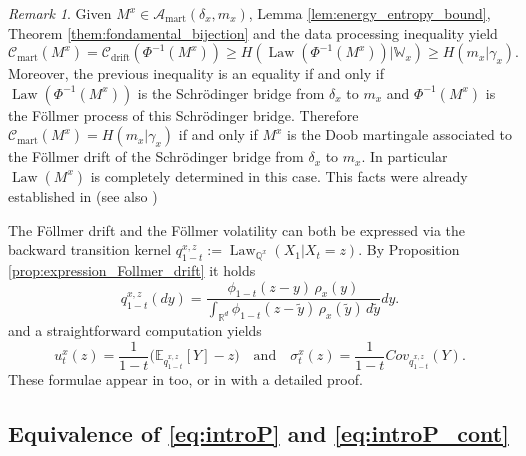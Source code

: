 \documentclass[reqno, a4paper]{amsart}
\theoremstyle{plain}
\theoremstyle{definition}
\theoremstyle{remark}
\newtheorem{remark}[theorem]{Remark}
\numberwithin{equation}{section}
\numberwithin{theorem}{section}
\newcommand{\R}{\mathbb{R}}
\newcommand{\E}{\mathbb{E}}
\newcommand{\Law}{\operatorname{Law}}
\begin{document}
	\begin{remark}\label{remq:uniquess_of_Pcont}
		Given $M^x \in \mathcal A_{\mathrm{mart}}(\delta_x,m_x)$, Lemma \ref{lem:energy_entropy_bound}, Theorem \ref{them:fondamental_bijection} and the data processing inequality yield $$\mathcal{C}_{\mathrm{mart}}(M^x) = \mathcal{C}_{\mathrm{drift}}(\Phi^{-1}(M^x)) \geq H(\Law(\Phi^{-1}(M^x))|\mathbb{W}_x) \geq H(m_x|\gamma_x).$$ Moreover, the previous inequality is an equality if and only if $\Law(\Phi^{-1}(M^x))$ is the Schrödinger bridge from $\delta_x$ to $m_x$ and $\Phi^{-1}(M^x)$ is the Föllmer process of this Schrödinger bridge. Therefore $\mathcal{C}_{\mathrm{mart}}(M^x) = H(m_x|\gamma_x)$ if and only if $M^x$ is the Doob martingale associated to the Föllmer drift of the Schrödinger bridge from $\delta_x$ to $m_x$. In particular $\Law(M^x)$ is completely determined in this case. This facts were already established in \cite{ElMi20} (see also \cite{CoFaMi24})
	\end{remark}
	The Föllmer drift and the Föllmer volatility can both be expressed via the backward transition kernel  $q_{1-t}^{x,z} := \Law_{\mathbb{Q}^x}(X_1|X_t = z)$. By Proposition \ref{prop:expression_Follmer_drift} it holds 
	\begin{equation}\label{eq:def-q-main}
		q_{1-t}^{x,z}(dy)
		=\frac{\phi_{1-t}(z-y)\,\rho_x(y)}{\int_{\R^d}\phi_{1-t}(z-\tilde y)\,\rho_x(\tilde y)\,d\tilde y}dy.
	\end{equation}
	and a straightforward computation yields
	\begin{equation}\label{eq:grad-logH-moment}
		u_t^x(z)
		=\frac{1}{1-t}\Big(\E_{q_{1-t}^{x,z}}[Y]-z\Big) \quad \text{and} \quad \sigma_t^x(z) =\frac{1}{1-t}Cov_{q_{1-t}^{x,z}}(Y).
	\end{equation}
	These formulae appear in \cite{ElMi20} too, or in \cite[Appendix A]{BaBeBiLe26v1} with a detailed proof.
	\subsection{Equivalence of \eqref{eq:introP} and \eqref{eq:introP_cont}}
	
\end{document}
